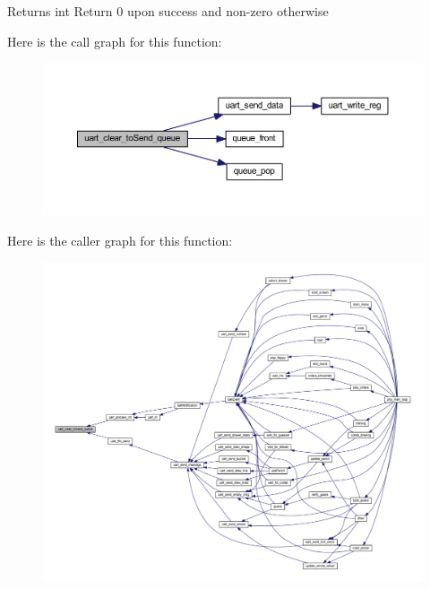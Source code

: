 \begin{DoxyReturn}{Returns}
int Return 0 upon success and non-\/zero otherwise 
\end{DoxyReturn}
Here is the call graph for this function\+:\nopagebreak
\begin{figure}[H]
\begin{center}
\leavevmode
\includegraphics[width=350pt]{group__uart_ga84207f2f52e2ff2eebd95de4ad5cc3ed_cgraph}
\end{center}
\end{figure}
Here is the caller graph for this function\+:\nopagebreak
\begin{figure}[H]
\begin{center}
\leavevmode
\includegraphics[width=350pt]{group__uart_ga84207f2f52e2ff2eebd95de4ad5cc3ed_icgraph}
\end{center}
\end{figure}
\mbox{\label{group__uart_ga5eb3f3881ed8e1ff240400ecc1c7d20c}} 
